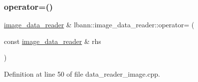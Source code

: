 \mbox{\label{classlbann_1_1image__data__reader_a76a0b52eafb9ad133fb45fec7cf44700}} 
\subsubsection{\texorpdfstring{operator=()}{operator=()}}
{\footnotesize\ttfamily \hyperlink{classlbann_1_1image__data__reader}{image\+\_\+data\+\_\+reader} \& lbann\+::image\+\_\+data\+\_\+reader\+::operator= (\begin{DoxyParamCaption}\item[{const \hyperlink{classlbann_1_1image__data__reader}{image\+\_\+data\+\_\+reader} \&}]{rhs }\end{DoxyParamCaption})}



Definition at line 50 of file data\+\_\+reader\+\_\+image.\+cpp.


